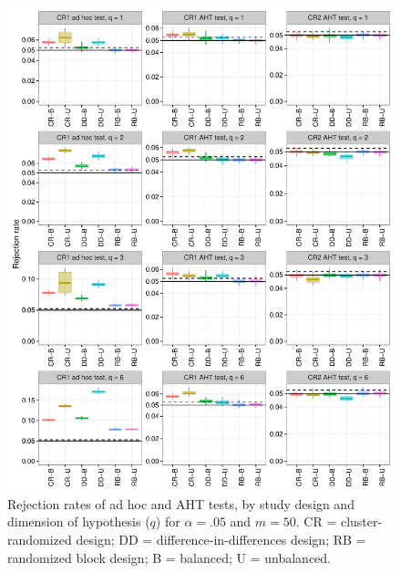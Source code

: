 \documentclass{article}\usepackage[]{graphicx}\usepackage[]{color}
\newenvironment{knitrout}{}{} %
\begin{document}
\begin{knitrout}
\color{fgcolor}\begin{figure}[H]

{\centering \includegraphics[width=\linewidth]{CR_fig/balance_05_50-1} 

}

\caption[Rejection rates of ad hoc and AHT tests, by study design and dimension of hypothesis (]{Rejection rates of ad hoc and AHT tests, by study design and dimension of hypothesis ($q$) for $\alpha = .05$ and $m = 50$. CR = cluster-randomized design; DD = difference-in-differences design; RB = randomized block design; B = balanced; U = unbalanced.}\label{fig:balance_05_50}
\end{figure}


\end{knitrout}
\end{document}
